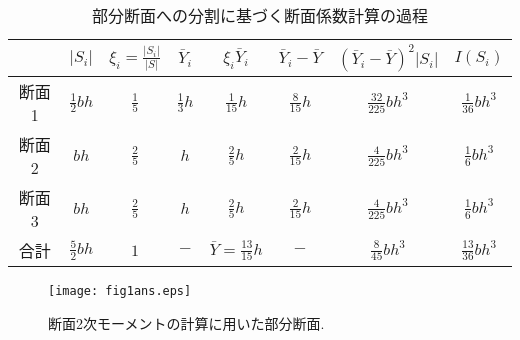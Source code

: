 \documentclass[10pt,a4j]{jarticle}
\begin{document}
\begin{table}
\begin{center}
	\caption{部分断面への分割に基づく断面係数計算の過程}
	\begin{tabular}{c||c|c|c|c|c|c|c}
		&
		$\left| S_i \right|$ & 
		$ \xi_i=\frac{\left| S_i \right|}{\left| S\right|} $  &
		$ \bar{Y}_i $ & 
		$ \xi_i\bar{Y}_i $ & 
		$\bar{Y}_i -\bar Y$ & 
		$ \left(\bar{Y}_i -\bar Y\right)^2\left| S_i \right|$ & 
		$ I(S_i)$  
		\\
		\hline 
		\hline 
		断面1&	
		$\frac{1}{2}bh$ & 
		$\frac{1}{5}$  &
		$\frac{1}{3}h$ & 
		$\frac{1}{15}h$ & 
		$\frac{8}{15}h$ & 
		$\frac{32}{225}bh^3$ &
		$\frac{1}{36}bh^3$ 
		\\
		\hline
		断面2&	
		$bh$ & 
		$\frac{2}{5}$  &
		$h$ & 
		$\frac{2}{5}h $ & 
		$\frac{2}{15}h$ & 
		$\frac{4}{225}bh^3$ &
		$\frac{1}{6}bh^3$ 
		\\
		\hline 
		断面3&	
		$bh$ & 
		$\frac{2}{5}$  &
		$h$ & 
		$\frac{2}{5}h $ & 
		$\frac{2}{15}h$ & 
		$\frac{4}{225}bh^3$ &
		$\frac{1}{6}bh^3$ 
		\\
		\hline 
		\hline 
		合計&	
		$\frac{5}{2}bh$ & 
		$1$  &
		$-$ & 
		$\bar Y=\frac{13}{15}h $ & 
		$-$ & 
		$\frac{8}{45}bh^3$ &
		$\frac{13}{36}bh^3$ 
	\end{tabular}
\label{tbl:tbl2}
\end{center}
\end{table}
\begin{figure}[h]
	\begin{center}
	\texttt{[image: fig1ans.eps]} 
	\end{center}
	\caption{断面2次モーメントの計算に用いた部分断面.} 
	\label{fig:fig1}
\end{figure}
\end{document}
